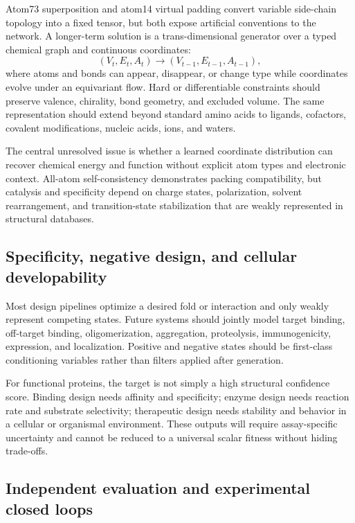 \documentclass[10pt]{article}
\begin{document}
Atom73 superposition and atom14 virtual padding convert variable side-chain topology into a fixed
tensor, but both expose artificial conventions to the network.  A longer-term solution is a
trans-dimensional generator over a typed chemical graph and continuous coordinates:
\begin{equation}
(V_t,E_t,A_t)
\longrightarrow
(V_{t-1},E_{t-1},A_{t-1}),
\label{eq:transdimensional-all-atom}
\end{equation}
where atoms and bonds can appear, disappear, or change type while coordinates evolve under an
equivariant flow.  Hard or differentiable constraints should preserve valence, chirality, bond
geometry, and excluded volume.  The same representation should extend beyond standard amino acids
to ligands, cofactors, covalent modifications, nucleic acids, ions, and waters.

The central unresolved issue is whether a learned coordinate distribution can recover chemical
energy and function without explicit atom types and electronic context.  All-atom self-consistency
demonstrates packing compatibility, but catalysis and specificity depend on charge states,
polarization, solvent rearrangement, and transition-state stabilization that are weakly represented
in structural databases.

\subsection{Specificity, negative design, and cellular developability}

Most design pipelines optimize a desired fold or interaction and only weakly represent competing
states.  Future systems should jointly model target binding, off-target binding, oligomerization,
aggregation, proteolysis, immunogenicity, expression, and localization.  Positive and negative
states should be first-class conditioning variables rather than filters applied after generation.

For functional proteins, the target is not simply a high structural confidence score.  Binding
design needs affinity and specificity; enzyme design needs reaction rate and substrate selectivity;
therapeutic design needs stability and behavior in a cellular or organismal environment.  These
outputs will require assay-specific uncertainty and cannot be reduced to a universal scalar fitness
without hiding trade-offs.

\subsection{Independent evaluation and experimental closed loops}
\end{document}
